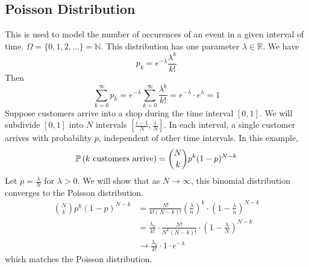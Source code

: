\documentclass{article}
\begin{document}
\subsection{Poisson Distribution}
This is used to model the number of occurences of an event in a given interval of time. $\Omega = \{ 0, 1, 2, \dots \} = \mathbb N$. This distribution has one parameter $\lambda \in \mathbb R$. We have
\[ p_k = e^{-\lambda} \frac{\lambda^k}{k!} \]
Then
\[ \sum_{k=0}^\infty p_k = e^{-\lambda}  \sum_{k=0}^\infty \frac{\lambda^k}{k!} = e^{-\lambda} \cdot e^{\lambda} = 1 \]
Suppose customers arrive into a shop during the time interval $[0, 1]$. We will subdivide $[0, 1]$ into $N$ intervals $\left[ \frac{i-1}{N}, \frac{i}{N} \right]$. In each interval, a single customer arrives with probability $p$, independent of other time intervals. In this example,
\[ \mathbb{P}\left({k \text{ customers arrive}}\right) = \binom{N}{k} p^k (1-p)^{N-k} \]
Let $p = \frac{\lambda}{N}$ for $\lambda > 0$. We will show that as $N \to \infty$, this binomial distribution converges to the Poisson distribution.
\begin{align*}
    \binom{N}{k} p^k (1-p)^{N-k} & = \frac{N!}{k!(N-k)!} \left( \frac{\lambda}{n} \right)^k \cdot \left( 1 - \frac{\lambda}{n} \right)^{N-k} \\
                                 & = \frac{\lambda_k}{k!} \cdot \frac{N!}{N^k(N-k)!} \cdot \left( 1 - \frac{\lambda}{N} \right)^{N-k}        \\
                                 & \to \frac{\lambda_k}{k!} \cdot 1 \cdot e^{-\lambda}
\end{align*}
which matches the Poisson distribution.
\end{document}
